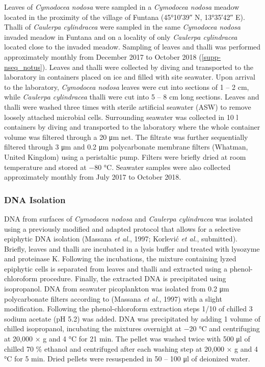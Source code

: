 \documentclass[12pt,]{article}
\begin{document}
Leaves of \emph{Cymodocea nodosa} were sampled in a \emph{Cymodocea
nodosa} meadow located in the proximity of the village of Funtana
(\ang{45;10;39} N, \ang{13;35;42} E). Thalli of \emph{Caulerpa
cylindracea} were sampled in the same \emph{Cymodocea nodosa} invaded
meadow in Funtana and on a locality of only \emph{Caulerpa cylindracea}
located close to the invaded meadow. Sampling of leaves and thalli was
performed approximately monthly from December 2017 to October 2018
(\autoref{supp-nseq_notus}). Leaves and thalli were collected by diving
and transported to the laboratory in containers placed on ice and filled
with site seawater. Upon arrival to the laboratory, \emph{Cymodocea
nodosa} leaves were cut into sections of 1 -- 2 \si{\cm}, while
\emph{Caulerpa cylindracea} thalli were cut into 5 -- 8 \si{\cm} long
sections. Leaves and thalli were washed three times with sterile
artificial seawater (ASW) to remove loosely attached microbial cells.
Surrounding seawater was collected in 10 \si{\l} containers by diving
and transported to the laboratory where the whole container volume was
filtered through a 20 \si{\um} net. The filtrate was further
sequentially filtered through 3 \si{\um} and 0.2 \si{\um} polycarbonate
membrane filters (Whatman, United Kingdom) using a peristaltic pump.
Filters were briefly dried at room temperature and stored at \num{-80}
\si{\degreeCelsius}. Seawater samples were also collected approximately
monthly from July 2017 to October 2018.

\hypertarget{dna-isolation}{%
\subsubsection{DNA Isolation}\label{dna-isolation}}

DNA from surfaces of \emph{Cymodocea nodosa} and \emph{Caulerpa
cylindracea} was isolated using a previously modified and adapted
protocol that allows for a selective epiphytic DNA isolation (Massana
\emph{et al.}, 1997; Korlević \emph{et al.}, submitted). Briefly, leaves
and thalli are incubated in a lysis buffer and treated with lysozyme and
proteinase K. Following the incubations, the mixture containing lyzed
epiphytic cells is separated from leaves and thalli and extracted using
a phenol-chloroform procedure. Finally, the extracted DNA is
precipitated using isopropanol. DNA from seawater picoplankton was
isolated from 0.2 \si{\um} polycarbonate filters according to (Massana
\emph{et al.}, 1997) with a slight modification. Following the
phenol-chloroform extraction steps 1/10 of chilled 3 \si{\Molar} sodium
acetate (pH 5.2) was added. DNA was precipitated by adding 1 volume of
chilled isopropanol, incubating the mixtures overnight at \num{-20}
\si{\degreeCelsius} and centrifuging at 20,000 × g and 4
\si{\degreeCelsius} for 21 \si{\minute}. The pellet was washed twice
with 500 \si{\ul} of chilled 70 \si{\percent} ethanol and centrifuged
after each washing step at 20,000 × g and 4 \si{\degreeCelsius} for 5
\si{\minute}. Dried pellets were resuspended in 50 -- 100 \si{\ul} of
deionized water.
\end{document}
